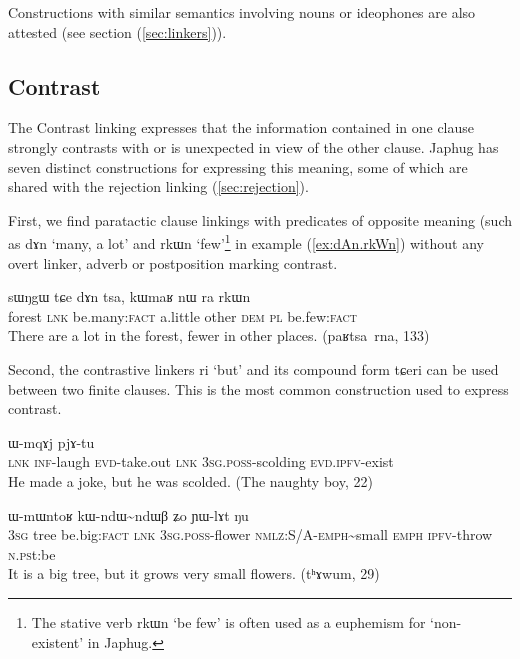 \documentclass[oldfontcommands,oneside,a4paper,11pt]{article}
\newcommand{\ipa}[1]{{\phon \mbox{#1}}} %
\newcommand{\refb}[1]{(\ref{#1})}
\begin{document}
Constructions with similar semantics involving nouns or ideophones are also attested (see section \refb{sec:linkers}).
 
 
 
 
\subsection{Contrast} \label{sec:contrast}
The Contrast linking expresses that the information contained in one clause strongly contrasts with or is unexpected in view of the other clause. Japhug has seven distinct constructions for expressing this meaning, some of which are shared with the rejection linking \refb{sec:rejection}.

First, we   find  paratactic clause linkings with predicates of opposite meaning (such as \ipa{dɤn} `many, a lot' and \ipa{rkɯn} `few'\footnote{The stative verb \ipa{rkɯn} `be few' is often used as a euphemism for `non-existent' in Japhug.} in example \refb{ex:dAn.rkWn} without any overt linker, adverb or postposition marking contrast.  

\begin{exe}
\ex \label{ex:dAn.rkWn}
\gll
 \ipa{sɯŋgɯ}  	\ipa{tɕe}  	\ipa{dɤn}  	\ipa{tsa,}  	\ipa{kɯmaʁ}  	\ipa{nɯ} \ipa{ra}  	\ipa{rkɯn}  \\
 forest \textsc{lnk} be.many:\textsc{fact} a.little other \textsc{dem} \textsc{pl} be.few:\textsc{fact} \\
\glt There are a lot in the forest, fewer in other places. (\ipa{paʁtsa rna}, 133)
\end{exe}

Second, the contrastive linkers \ipa{ri} `but' and its compound form \ipa{tɕeri} can be used between two finite clauses. This is the most common construction used to express contrast.
\begin{exe}
\ex \label{ex:ri.adversative}
\gll
[\ipa{tɕe}  	\ipa{kɤ-nɤre}  	\ipa{pjɤ-tɕɤt}]  	\ipa{\textbf{ri}}  	\ipa{ɯ-mqɤj}  	\ipa{pjɤ-tu}  \\
\textsc{lnk} \textsc{inf}-laugh \textsc{evd}-take.out \textsc{lnk} \textsc{3sg.poss}-scolding
\textsc{evd.ipfv}-exist\\
\glt He made a joke, but he was scolded. (The naughty boy, 22)
\end{exe}

\begin{exe}
\ex \label{ex:wxti.ri}
\gll
[\ipa{ɯʑo}    	\ipa{si}    	\ipa{wxti}]    	\ipa{\textbf{ri},}    	\ipa{ɯ-mɯntoʁ}    	\ipa{kɯ-ndɯ\textasciitilde{}ndɯβ}    	\ipa{ʑo}    	\ipa{ɲɯ-lɤt}    	\ipa{ŋu}    \\
\textsc{3sg} tree be.big:\textsc{fact} \textsc{lnk} \textsc{3sg.poss}-flower \textsc{nmlz}:S/A-\textsc{emph}\textasciitilde{}small \textsc{emph} \textsc{ipfv}-throw \textsc{n.ps}t:be\\
\glt It is a big tree, but it grows very small flowers. (\ipa{tʰɤwum}, 29)
\end{exe}
\end{document}

